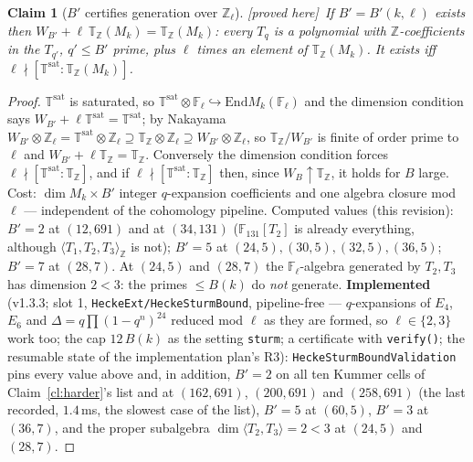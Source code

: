 \documentclass[11pt]{article}
\newtheorem{claim}[theorem]{Claim}
\theoremstyle{remark}
\newcommand{\F}{\mathbb{F}}
\newcommand{\Z}{\mathbb{Z}}
\newcommand{\End}{\mathrm{End}}
\newcommand{\Fl}{\F_\ell}
\newcommand{\T}{\mathbb{T}}
\newcommand{\PROVED}{\textsf{[proved here]}}
\begin{document}
\begin{claim}[$B'$ certifies generation over $\Z_\ell$]\label{cl:bprime}\PROVED\
If $B'=B'(k,\ell)$ exists then $W_{B'}+\ell\,\T_\Z(M_k)=\T_\Z(M_k)$: every $T_q$ is a polynomial
with $\Z$-coefficients in the $T_{q'}$, $q'\le B'$ prime, plus $\ell$ times an element of
$\T_\Z(M_k)$. It exists iff $\ell\nmid[\T^{\mathrm{sat}}:\T_\Z(M_k)]$.
\end{claim}
\begin{proof}
$\T^{\mathrm{sat}}$ is saturated, so $\T^{\mathrm{sat}}\otimes\Fl\hookrightarrow\End M_k(\Fl)$ and
the dimension condition says $W_{B'}+\ell\T^{\mathrm{sat}}=\T^{\mathrm{sat}}$; by Nakayama
$W_{B'}\otimes\Z_\ell=\T^{\mathrm{sat}}\otimes\Z_\ell\supseteq\T_\Z\otimes\Z_\ell\supseteq W_{B'}\otimes\Z_\ell$,
so $\T_\Z/W_{B'}$ is finite of order prime to $\ell$ and $W_{B'}+\ell\T_\Z=\T_\Z$. Conversely the
dimension condition forces $\ell\nmid[\T^{\mathrm{sat}}:\T_\Z]$, and if $\ell\nmid[\T^{\mathrm{sat}}:\T_\Z]$
then, since $W_B\uparrow\T_\Z$, it holds for $B$ large. Cost: $\dim M_k\times B'$ integer
$q$-expansion coefficients and one algebra closure mod $\ell$ --- independent of the cohomology
pipeline. Computed values (this revision): $B'=2$ at $(12,691)$ and at $(34,131)$ ($\F_{131}[T_2]$
is already everything, although $\langle T_1,T_2,T_3\rangle_\Z$ is not); $B'=5$ at
$(24,5),(30,5),(32,5),(36,5)$; $B'=7$ at $(28,7)$. At $(24,5)$ and $(28,7)$ the $\Fl$-algebra
generated by $T_2,T_3$ has dimension $2<3$: the primes $\le B(k)$ do \emph{not} generate.
\textbf{Implemented} (v1.3.3; slot 1, \texttt{HeckeExt/HeckeSturmBound}, pipeline-free ---
$q$-expansions of $E_4$, $E_6$ and $\Delta=q\prod(1-q^n)^{24}$ reduced mod $\ell$ as they are
formed, so $\ell\in\{2,3\}$ work too; the cap $12\,B(k)$ as the setting \texttt{sturm}; a
certificate with \texttt{verify()}; the resumable state of the implementation plan's R3):
\texttt{HeckeSturmBoundValidation} pins every value above and, in addition, $B'=2$ on all ten
Kummer cells of Claim~\ref{cl:harder}'s list and at $(162,691)$, $(200,691)$ and
$(258,691)$ (the last recorded, $1.4$\,ms, the slowest case of the list), $B'=5$ at
$(60,5)$, $B'=3$ at $(36,7)$, and the proper subalgebra $\dim\langle T_2,T_3\rangle=2<3$ at
$(24,5)$ and $(28,7)$.
\end{proof}
\end{document}
